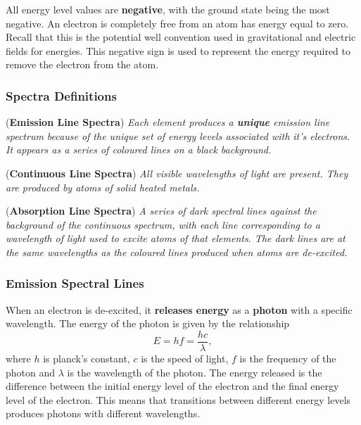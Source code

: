 All energy level values are \textbf{negative}, with the ground state being the most negative. An electron is completely free from an atom has energy equal to zero. Recall that this is the potential well convention used in gravitational and electric fields for energies. This negative sign is used to represent the energy required to remove the electron from the atom.

\subsubsection*{Spectra Definitions}
\begin{definition}{(\textbf{Emission Line Spectra})}
\textit{Each element produces a \textbf{unique} emission line spectrum because of the unique set of energy levels associated with it's electrons. It appears as a series of coloured lines on a black background.}
\end{definition}
\begin{definition}{(\textbf{Continuous Line Spectra})}
\textit{All visible wavelengths of light are present. They are produced by atoms of solid heated metals.}
\end{definition}
\begin{definition}{(\textbf{Absorption Line Spectra})}
\textit{A series of dark spectral lines against the background of the continuous spectrum, with each line corresponding to a wavelength of light used to excite atoms of that elements. The dark lines are at the same wavelengths as the coloured lines produced when atoms are de-excited.}
\end{definition}

\subsubsection*{Emission Spectral Lines}

When an electron is de-excited, it \textbf{releases energy} as a \textbf{photon} with a specific wavelength. The energy of the photon is given by the relationship
\begin{equation}
    E = hf = \frac{hc}{\lambda},
\end{equation}
where $h$ is planck's constant, $c$ is the speed of light, $f$ is the frequency of the photon and $\lambda$ is the wavelength of the photon. The energy released is the difference between the initial energy level of the electron and the final energy level of the electron. This means that transitions between different energy levels produces photons with different wavelengths. 

